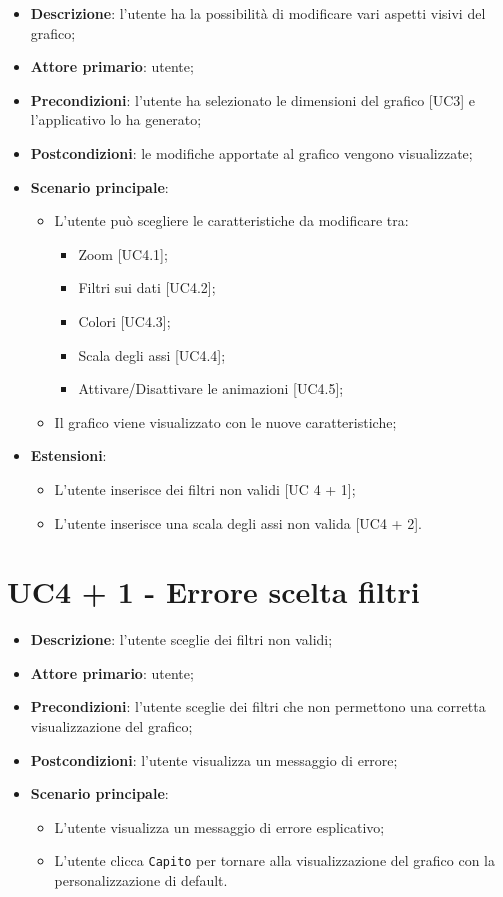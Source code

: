\begin{itemize}
  \item \textbf{Descrizione}: l'utente ha la possibilità di modificare vari aspetti visivi del grafico;
  \item \textbf{Attore primario}: utente;
  \item \textbf{Precondizioni}: l'utente ha selezionato le dimensioni del grafico [UC3] e l'applicativo lo ha generato;
  \item \textbf{Postcondizioni}: le modifiche apportate al grafico vengono visualizzate;
  \item \textbf{Scenario principale}: 
  \begin{itemize}
    \item L'utente può scegliere le caratteristiche da modificare tra: 
      \begin{itemize}
        \item Zoom [UC4.1];
        \item Filtri sui dati [UC4.2];
        \item Colori [UC4.3];
        \item Scala degli assi [UC4.4];
        \item Attivare/Disattivare le animazioni [UC4.5];
      \end{itemize}
    \item Il grafico viene visualizzato con le nuove caratteristiche;
  \end{itemize}
  \item \textbf{Estensioni}: 
    \begin{itemize}
      \item L'utente inserisce dei filtri non validi [UC 4 + 1];
      \item L'utente inserisce una scala degli assi non valida [UC4 + 2].
    \end{itemize}
\end{itemize}

\section{UC4 + 1 - Errore scelta filtri}
\begin{itemize}
  \item \textbf{Descrizione}: l'utente sceglie dei filtri non validi;
  \item \textbf{Attore primario}: utente;
  \item \textbf{Precondizioni}: l'utente sceglie dei filtri che non permettono una corretta visualizzazione del grafico;
  \item \textbf{Postcondizioni}: l'utente visualizza un messaggio di errore;
  \item \textbf{Scenario principale}: 
    \begin{itemize}
      \item L'utente visualizza un messaggio di errore esplicativo;
      \item L'utente clicca \texttt{Capito} per tornare alla visualizzazione del grafico con la personalizzazione di default.
    \end{itemize}
\end{itemize}

